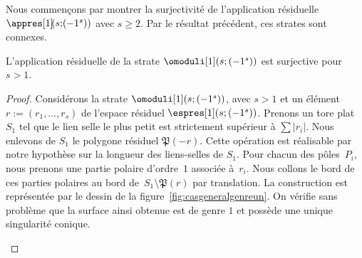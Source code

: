 Nous commençons par montrer la surjectivité de l'application résiduelle $\appres[1]\!(s;\!(-1^{s}))$ avec $s\geq2$. Par le résultat précédent, ces strates sont connexes.
\begin{lem}\label{lem:gunspe1}
L'application résiduelle de la strate $\omoduli[1](s;(-1^{s}))$ est surjective pour $s>1$.
\end{lem}
\begin{proof}
Considérons la strate $\omoduli[1](s;(-1^{s}))$, avec $s>1$ et un élément $r:=(r_{1},\dots,r_{s})$ de l'espace résiduel $\espres[1](s;(-1^{s}))$. Prenons un tore plat $S_{1}$ tel que le lien selle le plus petit est strictement supérieur à $\sum|r_{i}|$. Nous enlevons de $S_{1}$ le polygone résiduel $\mathfrak{P}(-r)$. Cette opération est réalisable par notre hypothèse sur la longueur des liens-selles de $S_{1}$.
Pour chacun des pôles~$P_{i}$, nous prenons une partie polaire d'ordre~$1$ associée à~$r_{i}$. Nous collons le bord de ces parties polaires au bord de~$S_{1}\setminus \mathfrak{P}(r)$ par translation. La construction est représentée par le dessin de la figure~\ref{fig:casgeneralgenreun}. On vérifie sans problème que la surface ainsi obtenue est de genre $1$ et possède une unique singularité conique.
\begin{figure}[htb]
\center
{}
\end{figure}
\end{proof}
